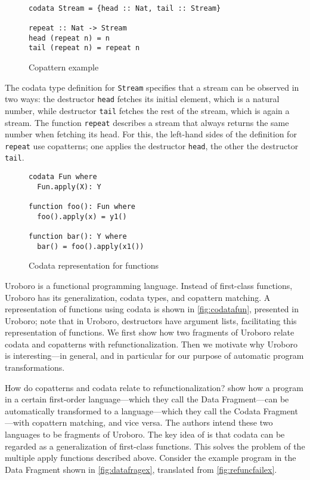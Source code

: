 \begin{figure}
\begin{lstlisting}

codata Stream = {head :: Nat, tail :: Stream}

repeat :: Nat -> Stream
head (repeat n) = n
tail (repeat n) = repeat n

\end{lstlisting}
\caption{Copattern example}
\label{fig:codataex}
\end{figure}

The codata type definition for \texttt{Stream} specifies that a stream can be observed in two ways: the destructor \texttt{head} fetches its initial element, which is a natural number, while destructor \texttt{tail} fetches the rest of the stream, which is again a stream. The function \texttt{repeat} describes a stream that always returns the same number when fetching its head. For this, the left-hand sides of the definition for \texttt{repeat} use copatterns; one applies the destructor \texttt{head}, the other the destructor \texttt{tail}.

\begin{figure}
\begin{lstlisting}
codata Fun where
  Fun.apply(X): Y

function foo(): Fun where
  foo().apply(x) = y1()

function bar(): Y where
  bar() = foo().apply(x1())
\end{lstlisting}
\caption{Codata representation for functions}
\label{fig:codatafun}
\end{figure}

Uroboro is a functional programming language. Instead of first-class functions, Uroboro has its generalization, codata types, and copattern matching. A representation of functions using codata is shown in \autoref{fig:codatafun}, presented in Uroboro; note that in Uroboro, destructors have argument lists, facilitating this representation of functions. We first show how two fragments of Uroboro relate codata and copatterns with refunctionalization. Then we motivate why Uroboro is interesting---in general, and in particular for our purpose of automatic program transformations.

How do copatterns and codata relate to refunctionalization? \citet{rendel15automatic} show how a program in a certain first-order language---which they call the Data Fragment---can be automatically transformed to a language---which they call the Codata Fragment---with copattern matching, and vice versa. The authors intend these two languages to be fragments of Uroboro. The key idea of \citeauthor{rendel15automatic} is that codata can be regarded as a generalization of first-class functions. This solves the problem of the multiple apply functions described above. Consider the example program in the Data Fragment shown in \autoref{fig:datafragex}, translated from \autoref{fig:refuncfailex}.

